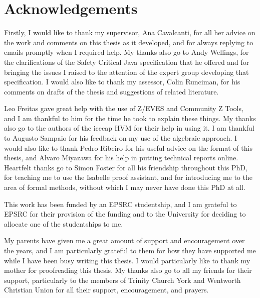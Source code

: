 \documentclass[a4paper,11pt]{report}
\begin{document}
\tableofcontents

\cleardoublepage
{}
{}
\listoftables

\cleardoublepage
{}
{}
\listoffigures

\cleardoublepage
{}
{}
\chapter*{Acknowledgements}

Firstly, I would like to thank my supervisor, Ana Cavalcanti, for all
her advice on the work and comments on this thesis as it developed,
and for always replying to emails promptly when I required help.
My thanks also go to Andy Wellings, for the clarifications of the
Safety Critical Java specification that he offered and for bringing
the issues I raised to the attention of the expert group developing
that specification.
I would also like to thank my assessor, Colin Runciman, for his
comments on drafts of the thesis and suggestions of related
literature.

Leo Freitas gave great help with the use of Z/EVES and Community Z
Tools, and I am thankful to him for the time he took to explain these
things.
My thanks also go to the authors of the icecap HVM for their help in
using it.
I am thankful to Augusto Sampaio for his feedback on my use of the
algebraic approach.
I would also like to thank Pedro Ribeiro for his useful advice on the
format of this thesis, and Alvaro Miyazawa for his help in putting
technical reports online.
Heartfelt thanks go to Simon Foster for all his friendship throughout
this PhD, for teaching me to use the Isabelle proof assistant, and for
introducing me to the area of formal methods, without which I may
never have done this PhD at all.

This work has been funded by an EPSRC studentship, and I am grateful to
EPSRC for their provision of the funding and to the University for
deciding to allocate one of the studentships to me.

My parents have given me a great amount of support and encouragement
over the years, and I am particularly grateful to them for how they
have supported me while I have been busy writing this thesis. 
I would particularly like to thank my mother for proofreading this
thesis.
My thanks also go to all my friends for their support, particularly to
the members of Trinity Church York and Wentworth Christian Union for
all their support, encouragement, and prayers.
\end{document}
